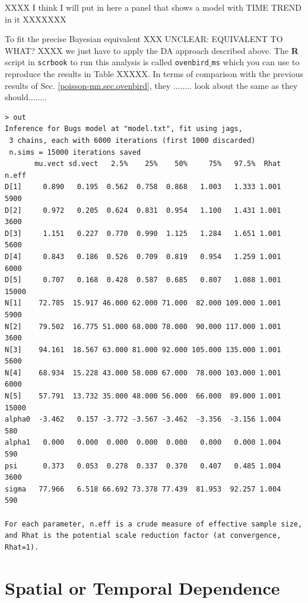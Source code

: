 XXXX I think I will put in here a panel that shows a model with TIME
TREND in it XXXXXXX

To fit the precise Bayesian equivalent XXX UNCLEAR: EQUIVALENT TO WHAT? XXXX we just have to apply the DA
approach described above. The {\bf R} script in \mbox{\tt scrbook} to run this analysis 
is called \mbox{\tt ovenbird$\_$ms} which you can use to reproduce the
results in Table XXXXX.
In terms of comparison with the previous results of
Sec. \ref{poisson-mn.sec.ovenbird}, they ........
look about the same as they should........ 
{\small
\begin{verbatim}
> out
Inference for Bugs model at "model.txt", fit using jags,
 3 chains, each with 6000 iterations (first 1000 discarded)
 n.sims = 15000 iterations saved
       mu.vect sd.vect   2.5%    25%    50%     75%   97.5%  Rhat n.eff
D[1]     0.890   0.195  0.562  0.758  0.868   1.003   1.333 1.001  5900
D[2]     0.972   0.205  0.624  0.831  0.954   1.100   1.431 1.001  3600
D[3]     1.151   0.227  0.770  0.990  1.125   1.284   1.651 1.001  5600
D[4]     0.843   0.186  0.526  0.709  0.819   0.954   1.259 1.001  6000
D[5]     0.707   0.168  0.428  0.587  0.685   0.807   1.088 1.001 15000
N[1]    72.785  15.917 46.000 62.000 71.000  82.000 109.000 1.001  5900
N[2]    79.502  16.775 51.000 68.000 78.000  90.000 117.000 1.001  3600
N[3]    94.161  18.567 63.000 81.000 92.000 105.000 135.000 1.001  5600
N[4]    68.934  15.228 43.000 58.000 67.000  78.000 103.000 1.001  6000
N[5]    57.791  13.732 35.000 48.000 56.000  66.000  89.000 1.001 15000
alpha0  -3.462   0.157 -3.772 -3.567 -3.462  -3.356  -3.156 1.004   580
alpha1   0.000   0.000  0.000  0.000  0.000   0.000   0.000 1.004   590
psi      0.373   0.053  0.278  0.337  0.370   0.407   0.485 1.004  3600
sigma   77.966   6.518 66.692 73.378 77.439  81.953  92.257 1.004   590

For each parameter, n.eff is a crude measure of effective sample size,
and Rhat is the potential scale reduction factor (at convergence, Rhat=1).
\end{verbatim}
}

\section{Spatial or Temporal Dependence}

